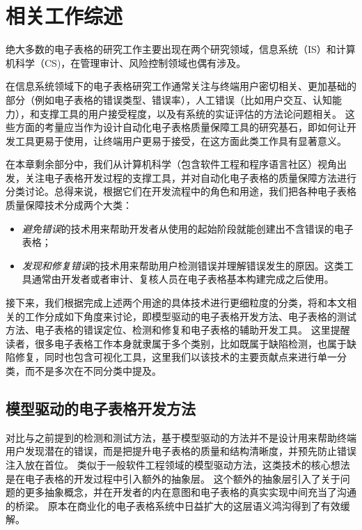 \chapter{相关工作综述}

绝大多数的电子表格的研究工作主要出现在两个研究领域，信息系统（IS）和计算机科学（CS)，在管理审计、风险控制领域也偶有涉及\cite{creeth1985microcomputer,galletta1993empirical}。

在信息系统领域下的电子表格研究工作通常关注与终端用户密切相关、更加基础的部分（例如电子表格的错误类型、错误率），人工错误（比如用户交互、认知能力），和支撑工具的用户接受程度，以及有系统的实证评估的方法论问题相关\cite{reinhart2010growth,galletta1996spreadsheet,powell2008critical,howe2006factors,olson1987analysis,panko1998we}。
这些方面的考量应当作为设计自动化电子表格质量保障工具的研究基石，即如何让开发工具更易于使用，让终端用户更易于接受，在这方面此类工作具有显著意义。

在本章剩余部分中，我们从计算机科学（包含软件工程和程序语言社区）视角出发，关注电子表格开发过程的支撑工具，并对自动化电子表格的质量保障方法进行分类讨论。总得来说，根据它们在开发流程中的角色和用途，我们把各种电子表格质量保障技术分成两个大类：

\begin{itemize}
    \item \textit{避免错误}的技术用来帮助开发者从使用的起始阶段就能创建出不含错误的电子表格；
    \item \textit{发现和修复错误}的技术用来帮助用户检测错误并理解错误发生的原因。这类工具通常由开发者或者审计、复核人员在电子表格基本构建完成之后使用。
\end{itemize}




接下来，我们根据完成上述两个用途的具体技术进行更细粒度的分类，将和本文相关的工作分成如下角度来讨论，即模型驱动的电子表格开发方法、电子表格的测试方法、电子表格的错误定位、检测和修复和电子表格的辅助开发工具。
这里提醒读者，很多电子表格工作本身就隶属于多个类别，比如既属于缺陷检测，也属于缺陷修复，同时也包含可视化工具，这里我们以该技术的主要贡献点来进行单一分类，而不是多次在不同分类中提及。

\section{模型驱动的电子表格开发方法}

对比与之前提到的检测和测试方法，基于模型驱动的方法并不是设计用来帮助终端用户发现潜在的错误，而是把提升电子表格的质量和结构清晰度，并预先防止错误注入放在首位。
类似于一般软件工程领域的模型驱动方法，这类技术的核心想法是在电子表格的开发过程中引入额外的抽象层。
这个额外的抽象层引入了关于问题的更多抽象概念，并在开发者的内在意图和电子表格的真实实现中间充当了沟通的桥梁。
原本在商业化的电子表格系统中日益扩大的这层语义鸿沟\cite{luckey2012systematic}得到了有效缓解。

